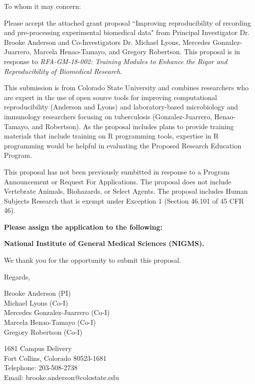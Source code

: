 \documentclass[pdftex,english,11pt,parskip=half]{scrartcl}
\begin{document}
\def\bf{\normalfont\bfseries}
\pagestyle{empty}

To whom it may concern:

\vspace{0.2in}

Please accept the attached grant proposal ``Improving reproducibility of recording and pre-processing experimental biomedical data" from Principal Investigator Dr. Brooke Anderson and Co-Investigators Dr. Michael Lyons, Mercedes Gonzalez-Juarrero, Marcela Henao-Tamayo, and Gregory Robertson. This proposal is in response  to \textit{RFA-GM-18-002: Training Modules to Enhance the Rigor and Reproducibility of Biomedical Research}.

\vspace{0.1in}

This submission is from Colorado State University and combines researchers who are expert in the use of open source tools for improving computational reproducibility (Anderson and Lyons) and laboratory-based microbiology and immunology researchers focusing on tuberculosis (Gonzalez-Juarrero, Henao-Tamayo, and Robertson). As the proposal includes plans to provide training materials that include training on R programming tools, expertise in R programming would be helpful in evaluating the Proposed Research Education Program.

\vspace{0.1in}

This proposal has not been previously sumbitted in response to a Program Announcement or Request For Applications. The proposal does not include Vertebrate Animals, Biohazards, or Select Agents. The proposal includes Human Subjects Research that is exempt under Exception 1 (Section 46.101 of 45 CFR 46).

\vspace{0.1in}

\noindent \textbf{Please assign the application to the following:}
\begin{description}
 \item \textbf{National Institute of General Medical Sciences (NIGMS).} 
 \end{description}

\vspace{0.1in}

We thank you for the opportunity to submit this proposal. 

\vspace{0.2in}

Regards, 

Brooke Anderson (PI) \\
Michael Lyons (Co-I) \\
Mercedes Gonzalez-Juarrero (Co-I) \\
Marcela Henao-Tamayo (Co-I) \\
Gregory Robertson (Co-I)

1681 Campus Delivery \\
Fort Collins, Colorado 80523-1681 \\
Telephone: 203-508-2738 \\
Email: brooke.anderson@colostate.edu \\
\end{document}
